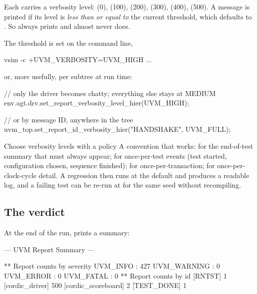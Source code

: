 %
Each  carries a verbosity level:
 (0),  (100),  (200),
 (300),  (400),  (500). A
message is printed if its level is \emph{less than or equal to} the current
threshold, which defaults to . So  always
prints and  almost never does.

The threshold is set on the command line,

\begin{shcode}
vsim -c +UVM_VERBOSITY=UVM_HIGH ...
\end{shcode}

or, more usefully, per subtree at run time:

\begin{uvmcode}
// only the driver becomes chatty; everything else stays at MEDIUM
env.agt.drv.set_report_verbosity_level_hier(UVM_HIGH);

// or by message ID, anywhere in the tree
uvm_top.set_report_id_verbosity_hier("HANDSHAKE", UVM_FULL);
\end{uvmcode}

\begin{tipbox}{Choose verbosity levels with a policy}
A convention that works:  for the end-of-test summary that
must always appear;  for once-per-test events (test started,
configuration chosen, sequence finished);  for
once-per-transaction;  for once-per-clock-cycle detail. A
regression then runs at the default and produces a readable log, and a
failing test can be re-run at  for the same seed without
recompiling.
\end{tipbox}

\subsection{The verdict}

%
At the end of the run,  prints a summary:

\begin{txtcode}
--- UVM Report Summary ---

** Report counts by severity
UVM_INFO :  427
UVM_WARNING :  0
UVM_ERROR :    0
UVM_FATAL :    0
** Report counts by id
[RNTST]            1
[cordic_driver]  500
[cordic_scoreboard] 2
[TEST_DONE]        1
\end{txtcode}

